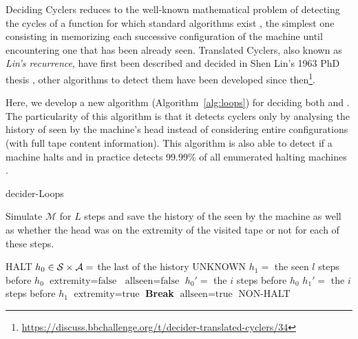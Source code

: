 Deciding Cyclers reduces to the well-known mathematical problem of detecting the cycles of a function for which standard algorithms exist \cite{wiki:Cycle_detection}, the simplest one consisting in memorizing each successive configuration of the machine until encountering one that has been already seen. Translated Cyclers, also known as \textit{Lin's recurrence}, have first been described and decided in Shen Lin's 1963 PhD thesis \cite{Lin1963}, other algorithms to detect them have been developed since then\footnote{\url{https://discuss.bbchallenge.org/t/decider-translated-cyclers/34}}.

Here, we develop a new algorithm (Algorithm~\ref{alg:loops}) for deciding both \cyclers and \TCs. The particularity of this algorithm is that it detects cyclers only by analysing the history of \ssps seen by the machine's head instead of considering entire configurations (\ie with full tape content information). This algorithm is also able to detect if a machine halts and in practice detects 99.99\% of all enumerated halting machines .

\newpage
\begin{algorithm}
  \caption{{\sc decider-Loops}}\label{alg:loops}

  \begin{algorithmic}[1]

    \State
    \State Simulate $\mathcal{M}$ for $L$ steps and save the history of the \ssps seen by the machine as well as whether the head was on the extremity of the visited tape or not for each of these steps.

    \State {}
    \State \Return HALT
    \EndIf
    \State
    \State $h_0\in \mathcal{S} \times \mathcal{A} = $ the last \ssp of the history
    \State \For{$l$ \textbf{in} $[0,+\infty[$ } 
    \State {} 
    \State \Return UNKNOWN
    \State \EndIf
    \State $h_1 =$ the \ssp seen $l$ steps before $h_0$
    \State $\text{extremity} = \text{false}$
    \State $\text{allseen} = \text{false}$
    \State {}
    \State $h_0' = $ the \ssp $i$ steps before $h_0$
    \State $h_1' = $ the \ssp $i$ steps before $h_1$
    \State {}
    \State $\text{extremity} = \text{true}$
    \EndIf
    \State {}
    \State \textbf{Break}
    \EndIf
    \State {}
    \State $\text{allseen} = \text{true}$
    \EndIf
    \EndFor
    \State {}
    \State \Return NON-HALT
    \EndIf
    \State \EndFor


  \end{algorithmic}
\end{algorithm}